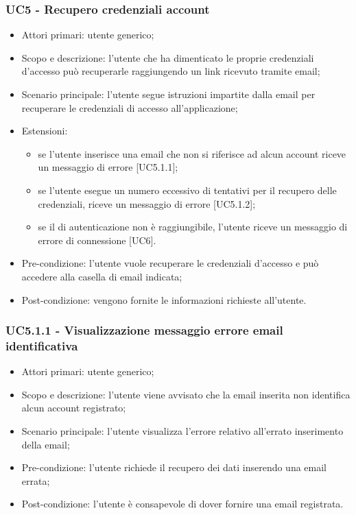 \subsubsection{UC5 - Recupero credenziali account}
\begin{itemize}
	\item  Attori primari: utente generico;
	\item  Scopo e descrizione: l'utente che ha dimenticato le proprie credenziali d'accesso può recuperarle raggiungendo un link ricevuto tramite email;
	\item  Scenario principale: l'utente segue istruzioni impartite dalla email per recuperare le credenziali di accesso all'applicazione;
	\item  Estensioni: 
		   \begin{itemize}
				\item se l'utente inserisce una email che non si riferisce ad alcun account riceve un messaggio di errore [UC5.1.1];
				\item se l'utente esegue un numero eccessivo di tentativi per il recupero delle credenziali, riceve un messaggio di errore [UC5.1.2];
				\item se il  di autenticazione non è raggiungibile, l'utente riceve un messaggio di errore di connessione [UC6].
		   \end{itemize}
	\item  Pre-condizione: l'utente vuole recuperare le credenziali d'accesso e può accedere alla casella di email indicata;
	\item  Post-condizione: vengono fornite le informazioni richieste all'utente.
\end{itemize}
\subsubsection{UC5.1.1 - Visualizzazione messaggio errore email identificativa}
\begin{itemize}
	\item  Attori primari: utente generico;
	\item  Scopo e descrizione: l'utente viene avvisato che la email inserita non identifica alcun account registrato;
	\item  Scenario principale: l'utente visualizza l'errore relativo all'errato inserimento della email;
	\item  Pre-condizione: l'utente richiede il recupero dei dati inserendo una email errata;
	\item  Post-condizione: l'utente è consapevole di dover fornire una email registrata.
\end{itemize}
